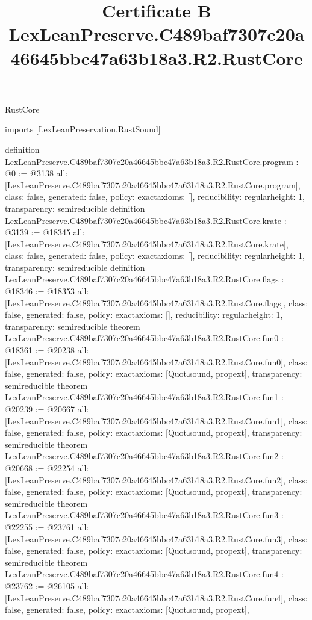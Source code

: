 \begin{lexlean}{RustCore}
\title{Certificate B LexLeanPreserve.C489baf7307c20a46645bbc47a63b18a3.R2.RustCore}
\begin{coremodule}
imports [LexLeanPreservation.RustSound]

definition LexLeanPreserve.C489baf7307c20a46645bbc47a63b18a3.R2.RustCore.program : @0 := @3138 {
  all: [LexLeanPreserve.C489baf7307c20a46645bbc47a63b18a3.R2.RustCore.program],
  class: false,
  generated: false,
  policy: exact{axioms: []},
  reducibility: regular{height: 1},
  transparency: semireducible
}
definition LexLeanPreserve.C489baf7307c20a46645bbc47a63b18a3.R2.RustCore.krate : @3139 := @18345 {
  all: [LexLeanPreserve.C489baf7307c20a46645bbc47a63b18a3.R2.RustCore.krate],
  class: false,
  generated: false,
  policy: exact{axioms: []},
  reducibility: regular{height: 1},
  transparency: semireducible
}
definition LexLeanPreserve.C489baf7307c20a46645bbc47a63b18a3.R2.RustCore.flags : @18346 := @18353 {
  all: [LexLeanPreserve.C489baf7307c20a46645bbc47a63b18a3.R2.RustCore.flags],
  class: false,
  generated: false,
  policy: exact{axioms: []},
  reducibility: regular{height: 1},
  transparency: semireducible
}
theorem LexLeanPreserve.C489baf7307c20a46645bbc47a63b18a3.R2.RustCore.fun0 : @18361 := @20238 {
  all: [LexLeanPreserve.C489baf7307c20a46645bbc47a63b18a3.R2.RustCore.fun0],
  class: false,
  generated: false,
  policy: exact{axioms: [Quot.sound, propext]},
  transparency: semireducible
}
theorem LexLeanPreserve.C489baf7307c20a46645bbc47a63b18a3.R2.RustCore.fun1 : @20239 := @20667 {
  all: [LexLeanPreserve.C489baf7307c20a46645bbc47a63b18a3.R2.RustCore.fun1],
  class: false,
  generated: false,
  policy: exact{axioms: [Quot.sound, propext]},
  transparency: semireducible
}
theorem LexLeanPreserve.C489baf7307c20a46645bbc47a63b18a3.R2.RustCore.fun2 : @20668 := @22254 {
  all: [LexLeanPreserve.C489baf7307c20a46645bbc47a63b18a3.R2.RustCore.fun2],
  class: false,
  generated: false,
  policy: exact{axioms: [Quot.sound, propext]},
  transparency: semireducible
}
theorem LexLeanPreserve.C489baf7307c20a46645bbc47a63b18a3.R2.RustCore.fun3 : @22255 := @23761 {
  all: [LexLeanPreserve.C489baf7307c20a46645bbc47a63b18a3.R2.RustCore.fun3],
  class: false,
  generated: false,
  policy: exact{axioms: [Quot.sound, propext]},
  transparency: semireducible
}
theorem LexLeanPreserve.C489baf7307c20a46645bbc47a63b18a3.R2.RustCore.fun4 : @23762 := @26105 {
  all: [LexLeanPreserve.C489baf7307c20a46645bbc47a63b18a3.R2.RustCore.fun4],
  class: false,
  generated: false,
  policy: exact{axioms: [Quot.sound, propext]},
}
\end{coremodule}
\end{lexlean}
